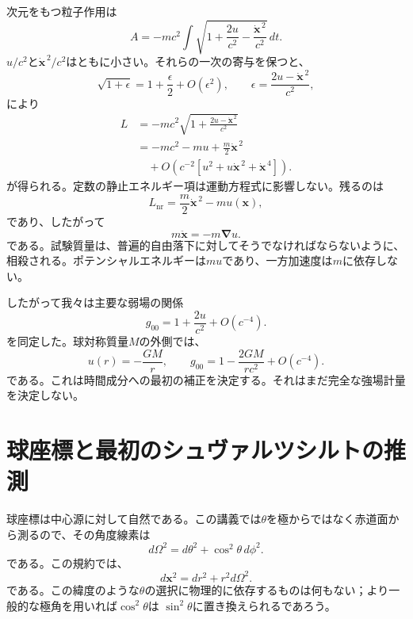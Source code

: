 次元をもつ粒子作用は
\begin{equation}
A=-mc^2\int
\sqrt{1+\frac{2u}{c^2}
-\frac{\dot{\mathbf{x}}^{\,2}}{c^2}}\,dt.
\label{eq:l5-weak-action}
\end{equation}
\(u/c^2\)と\(\dot{\mathbf{x}}^{\,2}/c^2\)はともに小さい。それらの一次の寄与を保つと、
\begin{equation}
\sqrt{1+\epsilon}
=1+\frac{\epsilon}{2}+O(\epsilon^2),
\qquad
\epsilon=\frac{2u-\dot{\mathbf{x}}^{\,2}}{c^2},
\end{equation}
により
\begin{align}
L
&=-mc^2
\sqrt{1+\frac{2u-\dot{\mathbf{x}}^{\,2}}{c^2}}\\
&=-mc^2-mu+\frac{m}{2}\dot{\mathbf{x}}^{\,2}\\
&\quad+O\!\left(c^{-2}
 [u^2+u\dot{\mathbf{x}}^{\,2}+\dot{\mathbf{x}}^{\,4}]\right).
\label{eq:l5-newton-expansion}
\end{align}
が得られる。定数の静止エネルギー項は運動方程式に影響しない。残るのは
\begin{equation}
L_{\mathrm{nr}}
=\frac{m}{2}\dot{\mathbf{x}}^{\,2}-m u(\mathbf{x}),
\label{eq:l5-newton-lagrangian}
\end{equation}
であり、したがって
\begin{equation}
m\ddot{\mathbf{x}}=-m\boldsymbol{\nabla}u.
\label{eq:l5-newton-equation}
\end{equation}
である。試験質量は、普遍的自由落下に対してそうでなければならないように、相殺される。ポテンシャルエネルギーは\(m u\)であり、一方加速度は\(m\)に依存しない。

したがって我々は主要な弱場の関係
\begin{equation}
g_{00}=1+\frac{2u}{c^2}+O(c^{-4}).
\label{eq:l5-g00-newton}
\end{equation}
を同定した。球対称質量\(M\)の外側では、
\begin{equation}
u(r)=-\frac{GM}{r},
\qquad
g_{00}=1-\frac{2GM}{rc^2}+O(c^{-4}).
\label{eq:l5-g00-spherical}
\end{equation}
である。これは時間成分への最初の補正を決定する。それはまだ完全な強場計量を決定しない。

\section{球座標と最初のシュヴァルツシルトの推測}

球座標は中心源に対して自然である。この講義では\(\theta\)を極からではなく赤道面から測るので、その角度線素は
\begin{equation}
d\Omega^2=d\theta^2+\cos^2\theta\,d\phi^2.
\label{eq:l5-angular-metric}
\end{equation}
である。この規約では、
\begin{equation}
d\mathbf{x}^2=dr^2+r^2d\Omega^2.
\label{eq:l5-flat-spherical}
\end{equation}
である。この緯度のような\(\theta\)の選択に物理的に依存するものは何もない；より一般的な極角を用いれば\(\cos^2\theta\)は
\(\sin^2\theta\)に置き換えられるであろう。


